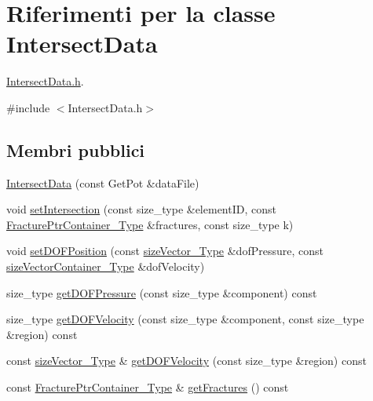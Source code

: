 \hypertarget{classIntersectData}{\section{Riferimenti per la classe Intersect\-Data}
\label{classIntersectData}
}


\hyperlink{IntersectData_8h}{Intersect\-Data.\-h}.  




{\ttfamily \#include $<$Intersect\-Data.\-h$>$}

\subsection*{Membri pubblici}
\begin{DoxyCompactItemize}
\item 
\hyperlink{classIntersectData_a6f368be5c978f120623bdef4b6acab12}{Intersect\-Data} (const Get\-Pot \&data\-File)
\item 
void \hyperlink{classIntersectData_a51a3df0f499c8150c32fe1f12f44ff8d}{set\-Intersection} (const size\-\_\-type \&element\-I\-D, const \hyperlink{FractureHandler_8h_a2f0b57e18ecf89912d7de0c87158009e}{Fracture\-Ptr\-Container\-\_\-\-Type} \&fractures, const size\-\_\-type k)
\item 
void \hyperlink{classIntersectData_ac4e5826b88471e0f1514cae82c49bcae}{set\-D\-O\-F\-Position} (const \hyperlink{Core_8h_a83c51913d041a5001e8683434c09857f}{size\-Vector\-\_\-\-Type} \&dof\-Pressure, const \hyperlink{Core_8h_a80e8381d86ecb0a7f4f87ff84d1a0be5}{size\-Vector\-Container\-\_\-\-Type} \&dof\-Velocity)
\item 
size\-\_\-type \hyperlink{classIntersectData_a50b33fda9608ffc678057b08e7aed405}{get\-D\-O\-F\-Pressure} (const size\-\_\-type \&component) const 
\item 
size\-\_\-type \hyperlink{classIntersectData_a8a5946e35f80576da495a107464cd2cb}{get\-D\-O\-F\-Velocity} (const size\-\_\-type \&component, const size\-\_\-type \&region) const 
\item 
const \hyperlink{Core_8h_a83c51913d041a5001e8683434c09857f}{size\-Vector\-\_\-\-Type} \& \hyperlink{classIntersectData_ae4cc921b5f9bee74c9a20b25ae7a6f37}{get\-D\-O\-F\-Velocity} (const size\-\_\-type \&region) const 
\item 
const \hyperlink{FractureHandler_8h_a2f0b57e18ecf89912d7de0c87158009e}{Fracture\-Ptr\-Container\-\_\-\-Type} \& \hyperlink{classIntersectData_a1c43bd327ed8dedaa89870f60cdb4606}{get\-Fractures} () const 

\end{DoxyCompactItemize}
